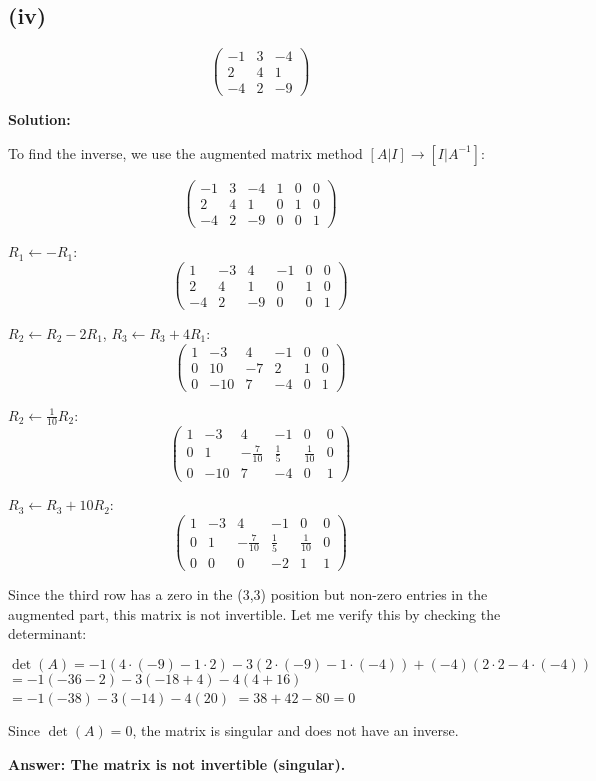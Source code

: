 \subsection*{(iv)}
\[
\begin{pmatrix}
-1 & 3 & -4\\
2 & 4 & 1\\
-4 & 2 & -9
\end{pmatrix}
\]

\textbf{Solution:}

To find the inverse, we use the augmented matrix method $[A|I] \rightarrow [I|A^{-1}]$:

\[
\left(\begin{array}{ccc|ccc}
-1 & 3 & -4 & 1 & 0 & 0\\
2 & 4 & 1 & 0 & 1 & 0\\
-4 & 2 & -9 & 0 & 0 & 1
\end{array}\right)
\]

$R_1 \leftarrow -R_1$:
\[
\left(\begin{array}{ccc|ccc}
1 & -3 & 4 & -1 & 0 & 0\\
2 & 4 & 1 & 0 & 1 & 0\\
-4 & 2 & -9 & 0 & 0 & 1
\end{array}\right)
\]

$R_2 \leftarrow R_2 - 2R_1$, $R_3 \leftarrow R_3 + 4R_1$:
\[
\left(\begin{array}{ccc|ccc}
1 & -3 & 4 & -1 & 0 & 0\\
0 & 10 & -7 & 2 & 1 & 0\\
0 & -10 & 7 & -4 & 0 & 1
\end{array}\right)
\]

$R_2 \leftarrow \frac{1}{10}R_2$:
\[
\left(\begin{array}{ccc|ccc}
1 & -3 & 4 & -1 & 0 & 0\\
0 & 1 & -\frac{7}{10} & \frac{1}{5} & \frac{1}{10} & 0\\
0 & -10 & 7 & -4 & 0 & 1
\end{array}\right)
\]

$R_3 \leftarrow R_3 + 10R_2$:
\[
\left(\begin{array}{ccc|ccc}
1 & -3 & 4 & -1 & 0 & 0\\
0 & 1 & -\frac{7}{10} & \frac{1}{5} & \frac{1}{10} & 0\\
0 & 0 & 0 & -2 & 1 & 1
\end{array}\right)
\]

Since the third row has a zero in the (3,3) position but non-zero entries in the augmented part, this matrix is not invertible. Let me verify this by checking the determinant:

$\det(A) = -1(4 \cdot (-9) - 1 \cdot 2) - 3(2 \cdot (-9) - 1 \cdot (-4)) + (-4)(2 \cdot 2 - 4 \cdot (-4))$
$= -1(-36 - 2) - 3(-18 + 4) - 4(4 + 16)$
$= -1(-38) - 3(-14) - 4(20)$
$= 38 + 42 - 80 = 0$

Since $\det(A) = 0$, the matrix is singular and does not have an inverse.

\textbf{Answer: The matrix is not invertible (singular).}